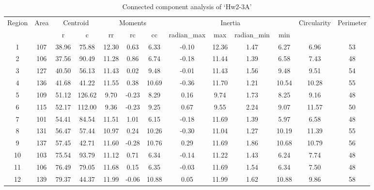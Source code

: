 \documentclass[a4paper]{article}
\begin{document}
\begin{table}[h]
	\centering
	\caption{Connected component analysis of `Hw2-3A'}
	\begin{tabular}{|c|c|c|c|c|c|c|c|c|c|c|c|c|}
		\hline
		\multirow{2}[4]{*}{Region} & \multirow{2}[4]{*}{Area} & \multicolumn{2}{c|}{Centroid} & \multicolumn{3}{c|}{Moments} & \multicolumn{4}{c|}{Inertia}  & \multirow{2}[4]{*}{Circularity} & \multirow{2}[4]{*}{Perimeter} \bigstrut\\
		\cline{3-11}          &       & r     & c     & rr    & rc    & cc    & radian\_max & max   & radian\_min & min   &       &  \bigstrut\\
		\hline
		1     & 107   & 38.96  & 75.88  & 12.30  & 0.63  & 6.33  & -0.10  & 12.36  & 1.47  & 6.27  & 6.96  & 53 \bigstrut\\
		\hline
		2     & 106   & 37.56  & 90.49  & 11.28  & 0.86  & 6.74  & -0.18  & 11.44  & 1.39  & 6.58  & 7.43  & 48 \bigstrut\\
		\hline
		3     & 127   & 40.50  & 56.13  & 11.43  & 0.02  & 9.48  & -0.01  & 11.43  & 1.56  & 9.48  & 9.51  & 54 \bigstrut\\
		\hline
		4     & 136   & 41.68  & 41.22  & 11.55  & 0.38  & 10.69  & -0.36  & 11.70  & 1.21  & 10.54  & 10.28  & 55 \bigstrut\\
		\hline
		5     & 109   & 51.12  & 126.62  & 9.70  & -0.23  & 8.29  & 0.16  & 9.74  & 1.73  & 8.25  & 9.16  & 48 \bigstrut\\
		\hline
		6     & 115   & 52.17  & 112.00  & 9.36  & -0.23  & 9.25  & 0.67  & 9.55  & 2.24  & 9.07  & 11.57  & 50 \bigstrut\\
		\hline
		7     & 101   & 54.41  & 84.54  & 11.51  & 1.01  & 6.15  & -0.18  & 11.69  & 1.39  & 5.97  & 6.58  & 48 \bigstrut\\
		\hline
		8     & 131   & 56.47  & 57.44  & 10.97  & 0.24  & 10.26  & -0.30  & 11.04  & 1.27  & 10.19  & 11.39  & 55 \bigstrut\\
		\hline
		9     & 137   & 57.45  & 42.71  & 11.60  & -0.28  & 10.76  & 0.29  & 11.69  & 1.86  & 10.68  & 10.79  & 56 \bigstrut\\
		\hline
		10    & 103   & 75.54  & 93.79  & 11.12  & 0.71  & 6.34  & -0.14  & 11.22  & 1.43  & 6.24  & 7.74  & 48 \bigstrut\\
		\hline
		11    & 106   & 76.49  & 79.05  & 11.68  & 0.15  & 6.35  & -0.03  & 11.69  & 1.54  & 6.34  & 7.50  & 48 \bigstrut\\
		\hline
		12    & 139   & 79.37  & 44.37  & 11.99  & -0.06  & 10.88  & 0.05  & 11.99  & 1.62  & 10.88  & 9.86  & 58 \bigstrut\\

\end{tabular}
\end{table}
\end{document}
